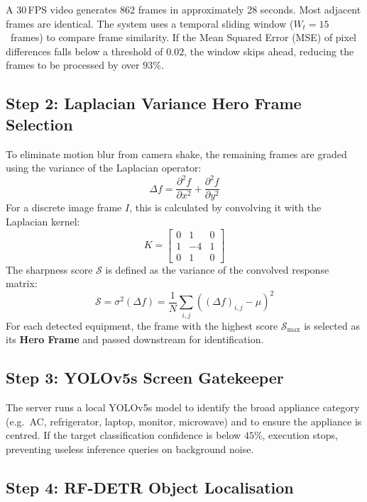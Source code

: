 A 30\,FPS video generates 862 frames in approximately 28 seconds. Most adjacent frames are identical. The system uses a temporal sliding window ($W_t = 15$~frames) to compare frame similarity. If the Mean Squared Error (MSE) of pixel differences falls below a threshold of $0.02$, the window skips ahead, reducing the frames to be processed by over $93\%$.

\subsection{Step 2: Laplacian Variance Hero Frame Selection}

To eliminate motion blur from camera shake, the remaining frames are graded using the variance of the Laplacian operator:
\begin{equation}
  \Delta f = \frac{\partial^2 f}{\partial x^2} + \frac{\partial^2 f}{\partial y^2}
\end{equation}
For a discrete image frame $I$, this is calculated by convolving it with the Laplacian kernel:
\begin{equation}
  K = \begin{bmatrix} 0 & 1 & 0 \\ 1 & -4 & 1 \\ 0 & 1 & 0 \end{bmatrix}
\end{equation}
The sharpness score $\mathcal{S}$ is defined as the variance of the convolved response matrix:
\begin{equation}
  \mathcal{S} = \sigma^2(\Delta f) = \frac{1}{N} \sum_{i,j} \left( (\Delta f)_{i,j} - \mu \right)^2
\end{equation}
For each detected equipment, the frame with the highest score $\mathcal{S}_{\max}$ is selected as its \textbf{Hero Frame} and passed downstream for identification.

\subsection{Step 3: YOLOv5s Screen Gatekeeper}

The server runs a local YOLOv5s model to identify the broad appliance category (e.g.\ AC, refrigerator, laptop, monitor, microwave) and to ensure the appliance is centred. If the target classification confidence is below $45\%$, execution stops, preventing useless inference queries on background noise.

\subsection{Step 4: RF-DETR Object Localisation}

